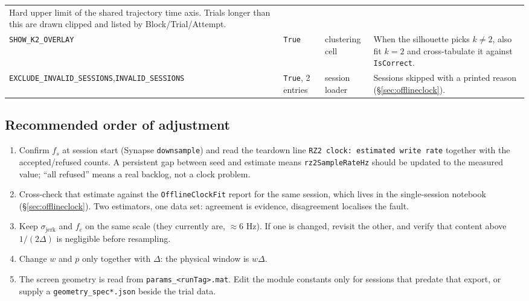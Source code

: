\documentclass[11pt,a4paper]{article}
\newcommand{\code}[1]{\texttt{\small #1}}
\begin{document}
\begin{longtable}{@{}P{4.0cm}P{1.65cm}P{3.55cm}P{5.75cm}@{}}
  Hard upper limit of the shared trajectory time axis. Trials longer than this
  are drawn clipped and listed by Block/Trial/Attempt. \\
\code{SHOW\_K2\_OVERLAY} & \code{True} & clustering cell &
  When the silhouette picks $k \ne 2$, also fit $k = 2$ and cross-tabulate it
  against \code{IsCorrect}. \\
\code{EXCLUDE\_INVALID\_\-SESSIONS},\newline\code{INVALID\_SESSIONS} & \code{True}, 2
  entries & session loader &
  Sessions skipped with a printed reason (\S\ref{sec:offlineclock}). \\
\bottomrule
\end{longtable}

\subsection{Recommended order of adjustment}

\begin{enumerate}[leftmargin=*,itemsep=3pt]
\item Confirm $f_s$ at session start (Synapse \code{downsample}) and read the
teardown line \code{RZ2 clock: estimated write rate} together with the
accepted/refused counts. A persistent gap between seed and estimate means
\code{rz2SampleRateHz} should be updated to the measured value; ``all refused''
means a real backlog, not a clock problem.
\item Cross-check that estimate against the \code{OfflineClockFit} report for
the same session, which lives in the single-session notebook
(\S\ref{sec:offlineclock}). Two estimators, one data set: agreement is evidence,
disagreement localises the fault.
\item Keep $\sigma_{\text{jerk}}$ and $f_c$ on the same scale (they currently
are, $\approx 6$ Hz). If one is changed, revisit the other, and verify that
content above $1/(2\Delta)$ is negligible before resampling.
\item Change $w$ and $p$ only together with $\Delta$: the physical window is
$w\Delta$.
\item The screen geometry is read from \code{params\_<runTag>.mat}. Edit the
module constants only for sessions that predate that export, or supply a
\code{geometry\_spec*.json} beside the trial data.
\end{enumerate}
\end{document}
